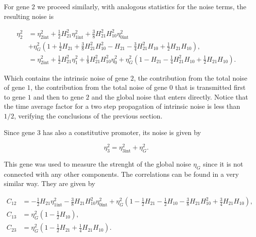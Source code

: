 For gene $2$ we proceed similarly, with analogous statistics for the noise terms, the resulting noise is

\begin{equation}
  \label{eq:etagene2}
  \begin{split}
    \eta_2^2 &= \eta_{2\text{int}}^2 +  \frac{1}{2}H_{21}^2\eta_{1\text{int}}^2+\frac{3}{8}H_{21}^2H_{10}^2\eta_{0\text{int}}^2\\
    &+\eta_G^2\left(1 + \frac{1}{2}H_{21} + \frac{3}{8}H_{21}^2H_{10}^2 - H_{21} -\frac{3}{4}H_{21}^2H_{10} + \frac{1}{2}H_{21}H_{10}\right),\\
    &= \eta_{2\text{int}}^2 + \frac{1}{2}H_{21}^2\eta_1^2+\frac{1}{8}H_{21}^2H_{10}^2\eta_0^2+\eta_G^2\left(1-H_{21}-\frac{1}{4}H_{21}^2H_{10}+\frac{1}{2}H_{21}H_{10}\right).
  \end{split}
\end{equation}

Which contains the intrinsic noise of gene $2$, the contribution from the total noise of gene $1$, the contribution from the total noise of gene $0$ that is transmitted first to gene $1$ and then to gene $2$ and the global noise that enters directly. Notice that the time average factor for a two step propagation of intrinsic noise is less than $1/2$, verifying the conclusions of the previous section.

Since gene $3$ has also a constitutive promoter, its noise is given by

\begin{equation}
  \label{eq:etagene3}
  \eta_3^2 = \eta_{3\text{int}}^2+\eta_G^2.
\end{equation}

This gene was used to measure the strenght of the global noise $\eta_G$ since it is not connected with any other components. The correlations can be found in a very similar way. They are given by

\begin{equation}
  \label{eq:lan-correl}
  \begin{split}
    C_{12}&=-\frac{1}{2}H_{21}\eta_{1\text{int}}^2 -\frac{3}{8}H_{21}H_{10}^2\eta_{0\text{int}}^2+\eta_G^2\left(1-\frac{1}{2}H_{21}-\frac{1}{2}H_{10}-\frac{3}{8}H_{21}H_{10}^2 + \frac{3}{4}H_{21}H_{10}\right),\\
    C_{13}&=\eta_G^2\left(1-\frac{1}{2}H_{10}\right),\\
    C_{23}&=\eta_G^2\left(1-\frac{1}{2}H_{21}+\frac{1}{4}H_{21}H_{10}\right).
  \end{split}
\end{equation}

